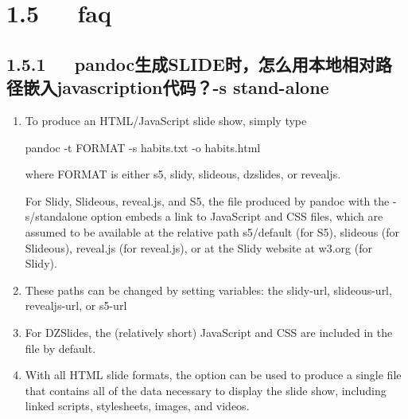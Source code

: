 \documentclass[letterpaper,12pt,english]{sphinxmanual}
\begin{document}
\section{1.5   faq}
\label{\detokenize{001software/001install/pandoc:faq}}

\subsection{1.5.1   pandoc生成SLIDE时，怎么用本地相对路径嵌入javascription代码？-s \textendash{}stand-alone}
\label{\detokenize{001software/001install/pandoc:pandocslide-javascription-s-stand-alone}}\begin{enumerate}
%
\item {} 
To produce an HTML/JavaScript slide show, simply type

pandoc -t FORMAT -s habits.txt -o habits.html

where FORMAT is either s5, slidy, slideous, dzslides, or revealjs.

For Slidy, Slideous, reveal.js, and S5, the file produced by pandoc
with the -s/\textendash{}standalone option embeds a link to JavaScript and CSS
files, which are assumed to be available at the relative path
s5/default (for S5), slideous (for Slideous), reveal.js (for
reveal.js), or at the Slidy website at w3.org (for Slidy).

\item {} 
These paths can be changed by setting variables: the slidy-url,
slideous-url, revealjs-url, or s5-url

\begin{sphinxVerbatim}[commandchars=\\\{\}]
 
     
\end{sphinxVerbatim}

\item {} 
For DZSlides, the (relatively short) JavaScript and CSS are included
in the file by default.

\item {} 
With all HTML slide formats, the  option can be
used to produce a single file that contains all of the data necessary
to display the slide show, including linked scripts, stylesheets,
images, and videos.

\end{enumerate}
\end{document}
